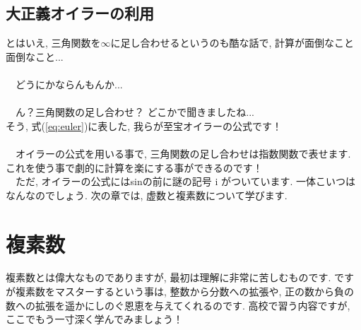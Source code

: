 \documentclass[11pt,a4paper]{ujreport}
\begin{document}
\section{大正義オイラーの利用}
とはいえ, 三角関数を$\infty$に足し合わせるというのも酷な話で, 計算が面倒なこと面倒なこと...\\
\\
　どうにかならんもんか...\\
\\
　ん？三角関数の足し合わせ？ どこかで聞きましたね...\\
そう, 式(\ref{eq:euler})に表した, 我らが至宝オイラーの公式です！\\
\\
　オイラーの公式を用いる事で, 三角関数の足し合わせは指数関数で表せます. これを使う事で劇的に計算を楽にする事ができるのです！\\
　ただ, オイラーの公式にはsinの前に謎の記号 i がついています. 一体こいつはなんなのでしょう. 次の章では, 虚数と複素数について学びます.\\

\chapter{複素数}
複素数とは偉大なものでありますが, 最初は理解に非常に苦しむものです. ですが複素数をマスターするという事は, 整数から分数への拡張や, 正の数から負の数への拡張を遥かにしのぐ恩恵を与えてくれるのです. 高校で習う内容ですが, ここでもう一寸深く学んでみましょう！\\
\end{document}
